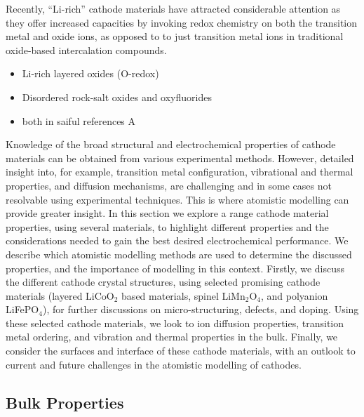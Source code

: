 \documentclass[../main.tex]{subfiles}
\begin{document}
Recently, ``Li-rich'' cathode materials have attracted considerable attention as they offer increased capacities by invoking redox chemistry on both the transition metal and oxide ions, as opposed to to just transition metal ions in traditional oxide-based intercalation compounds.

\begin{itemize}
    \item Li-rich layered oxides (O-redox)
    \item Disordered rock-salt oxides and oxyfluorides
    \item both in saiful references A
\end{itemize}

Knowledge of the broad structural and electrochemical properties of cathode materials can be obtained from various experimental methods. However, detailed insight into, for example, transition metal configuration, vibrational and thermal properties, and diffusion mechanisms, are challenging and in some cases not resolvable using experimental techniques. This is where atomistic modelling can provide greater insight. In this section we explore a range cathode material properties, using several materials, to highlight different properties and the considerations needed to gain the best desired electrochemical performance. We describe which atomistic modelling methods are used to determine the discussed properties, and the importance of modelling in this context. Firstly, we discuss the different cathode crystal structures, using selected promising cathode materials (layered LiCoO$_2$ based materials, spinel LiMn$_2$O$_4$, and polyanion LiFePO$_4$), for further discussions on micro-structuring, defects, and doping. Using these selected cathode materials, we look to ion diffusion properties, transition metal ordering, and vibration and thermal properties in the bulk. Finally, we consider the surfaces and interface of these cathode materials, with an outlook to current and future challenges in the atomistic modelling of cathodes.

\subsection{Bulk Properties}
\end{document}
